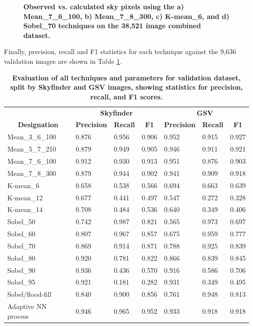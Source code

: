 \documentclass[final,3p,times,authoryear]{elsarticle}
\begin{document}
\begin{figure}
\caption{\textbf{Observed vs. calculated sky pixels using the a) Mean\_7\_6\_100, b) Mean\_7\_8\_300, c) K-mean\_6, and d) Sobel\_70 techniques on the 38,521 image combined dataset.} }
\label{fig:errorallcombined}
\end{figure}

Finally, precision, recall and F1 statistics for each technique against the 9,636 validation images are shown in Table \ref{tab:precision}.

\begin{table}[!htbp]
\caption{\bf Evaluation of all techniques and parameters for validation dataset, split by Skyfinder and GSV images, showing statistics for precision, recall, and F1 scores. \label{tab:precision}}     
\begin{tabular}{ l l l l l l l }
\multicolumn{1}{c}{\textbf{~}}
& \multicolumn{3}{c}{\textbf{Skyfinder}}
& \multicolumn{3}{c}{\textbf{GSV}}
\\ 
 \multicolumn{1}{c|}{\textbf{Designation}}
& \textbf{Precision} 
& \textbf{Recall} 
& \multicolumn{1}{c|}{\textbf{F1}}
& \textbf{Precision} 
& \textbf{Recall}  
& \multicolumn{1}{c|}{\textbf{F1}}
\\ \hline
Mean\_3\_6\_100	&0.876&0.956&0.906&0.952&0.915&0.927\\
Mean\_5\_7\_210	&0.879&0.949&0.905&0.946&0.911&0.921\\
Mean\_7\_6\_100	&0.912&0.930&0.913&0.951&0.876&0.903\\
Mean\_7\_8\_300 &0.879&0.944&0.902&0.941&0.909&0.918\\
K-mean\_6       &0.658&0.538&0.566&0.694&0.663&0.639\\
K-mean\_12      &0.677&0.441&0.497&0.547&0.272&0.328\\
K-mean\_14      &0.708&0.484&0.536&0.640&0.349&0.406\\
Sobel\_50       &0.742&0.987&0.821&0.565&0.973&0.697\\
Sobel\_60       &0.807&0.967&0.857&0.675&0.959&0.777\\
Sobel\_70       &0.869&0.914&0.871&0.788&0.925&0.839\\
Sobel\_80       &0.920&0.781&0.822&0.866&0.839&0.845\\
Sobel\_90       &0.936&0.436&0.570&0.916&0.586&0.706\\
Sobel\_95       &0.921&0.181&0.282&0.931&0.349&0.495\\
\hline
Sobel/flood-fill&0.840&0.900&0.856&0.761&0.948&0.813 \\
\hline
Adaptive NN process&0.946&0.965&0.952&0.933&0.918&0.918 \\
\hline
\end{tabular}
\end{table}
\end{document}
